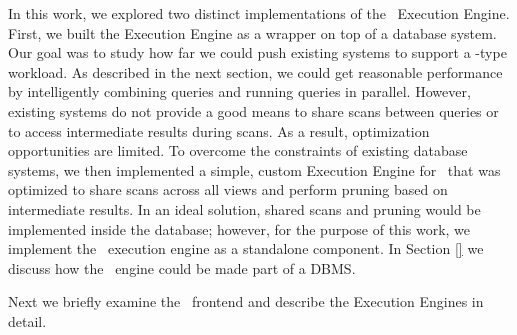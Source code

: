 In this work, we explored two distinct implementations of the \SeeDB\ Execution
Engine. 
First, we built the Execution Engine as a wrapper on top of a database system. 
Our goal was to study how far we could push existing systems to support a
\SeeDB-type workload.
As described in the next section, we could get reasonable performance by
intelligently combining queries and running queries in parallel. 
However, existing systems do not provide a good means to share scans between
queries or to access intermediate results during scans.
As a result, optimization opportunities are limited.
To overcome the constraints of existing database systems, we then implemented a
simple, custom Execution Engine for \SeeDB\ that was optimized to share scans
across all views and perform pruning based on intermediate results. 
In an ideal solution, shared scans and pruning would be implemented inside the
database; however, for the purpose of this work, we implement the \SeeDB\
execution engine as a standalone component. 
In Section \ref{} we discuss how the \SeeDB\ engine could be made part of a
DBMS.

Next we briefly examine the \SeeDB\ frontend and describe the Execution Engines
in detail.


% 



